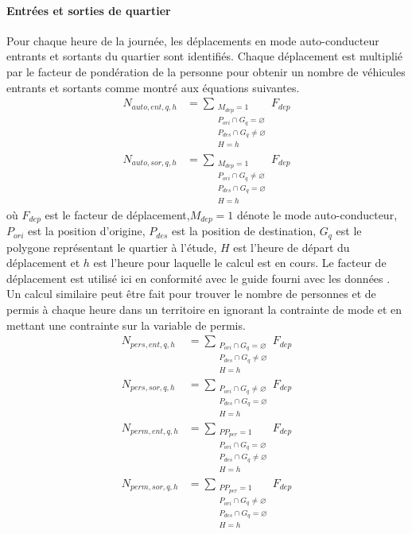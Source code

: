                 \paragraph{Entrées et sorties de quartier} Pour chaque heure de la journée, les déplacements en mode auto-conducteur entrants et sortants du quartier sont identifiés. Chaque déplacement est multiplié par le facteur de pondération de la personne pour obtenir un nombre de véhicules entrants et sortants comme montré aux équations suivantes.
                \begin{align}
                    N_{auto,ent,q,h} &= \sum_{\substack{M_{dep} = 1 \\ P_{ori} \cap G_q= \varnothing \\ P_{des} \cap G_q\neq \varnothing \\ H=h}} {F_{dep}} \\
                    N_{auto,sor,q,h} &= \sum_{\substack{M_{dep} = 1 \\ P_{ori} \cap G_q  \neq \varnothing \\ P_{des} \cap G_q = \varnothing \\ H=h}}{F_{dep}}
                \end{align} 
                où $F_{dep}$ est le facteur de déplacement,$M_{dep}=1$ dénote le mode auto-conducteur, $P_{ori}$ est la position d'origine, $P_{des}$ est la position de destination, $G_{q}$ est le polygone représentant le quartier à l'étude, $H$ est l'heure de départ du déplacement et $h$ est l'heure pour laquelle le calcul est en cours. Le facteur de déplacement est utilisé ici en conformité avec le guide fourni avec les données \parencite{ministere_des_transports_et_de_la_mobilite_durable_enquete_2017}. Un calcul similaire peut être fait pour trouver le nombre de personnes et de permis à chaque heure dans un territoire en ignorant la contrainte de mode et en mettant une contrainte sur la variable de permis. 
                \begin{align}
                    N_{pers,ent,q,h} &= \sum_{\substack{P_{ori} \cap G_q = \varnothing \\ P_{des} \cap G_q\neq \varnothing \\ H=h}}{F_{dep}} \\
                    N_{pers,sor,q,h} &= \sum_{\substack{P_{ori} \cap G_q \neq \varnothing \\ P_{des} \cap G_q = \varnothing \\ H=h}}{F_{dep}}   \\
                    N_{perm,ent,q,h} &= \sum_{\substack{PP_{per} =1 \\ P_{ori} \cap G_q = \varnothing\\ P_{des} \cap G_q \neq \varnothing \\ H=h }}{F_{dep}}\\
                    N_{perm,sor,q,h} &= \sum_{\substack{PP_{per} =1 \\  P_{ori} \cap G_q \neq \varnothing \\ P_{des} \cap G_q = \varnothing \\ H=h}}{F_{dep}} 
                \end{align}
